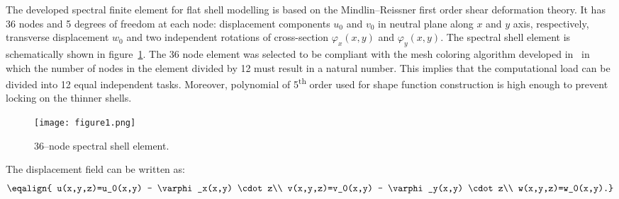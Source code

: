 \documentclass[12pt]{iopart}
\begin{document}
The developed spectral finite element for flat shell modelling is based on the Mindlin--Reissner first order shear deformation theory. It has 36 nodes and 5 degrees of freedom at each node: displacement components \(u_0\) and \(v_0\) in neutral plane along \(x\) and \(y\) axis, respectively, transverse displacement \(w_0\) and two independent rotations of cross-section \(\varphi_x(x,y)\) and \(\varphi_y(x,y)\). The spectral shell element is schematically shown in figure~\ref{fig:spectral_shell_element}. The 36 node element was selected to be compliant with the mesh coloring algorithm developed in~\cite{Kudela2016} in which the number of nodes in the element divided by 12 must result in a natural number. This implies that the computational load can be divided into 12 equal independent tasks. Moreover, polynomial of 5\textsuperscript{th} order used for shape function construction is high enough to prevent locking on the thinner shells.
\begin{figure} [h!]
	\centering
	\texttt{[image: figure1.png]}	
	\caption{36--node spectral shell element.}
	\label{fig:spectral_shell_element}
\end{figure}

The displacement field can be written as:
\begin{equation}
\eqalign{
u(x,y,z)=u_0(x,y) - \varphi_x(x,y) \cdot z\\
v(x,y,z)=v_0(x,y) - \varphi_y(x,y) \cdot z\\
w(x,y,z)=w_0(x,y).}
 \label{eq:delam_platedispl}
\end{equation}
\end{document}
